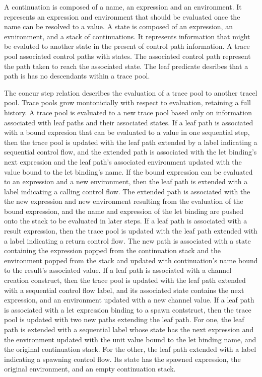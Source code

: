 \documentclass{article}
\begin{document}
A continuation is composed of a name, an expression and an environment.  It represents an expression and environment that should be evaluated once the name can be resolved to a value.  A state is composed of an expression, an evnironment, and a stack of continuations.  It represents information that might be evaluted to another state in the present of control path information.  A trace pool associated control paths with states.  The associated control path represent the path taken to reach the associated state.
The leaf predicate desribes that a path is has no descendants within a trace pool.  

The concur step relation describes the evaluation of a trace pool to another tracel pool.  Trace pools grow montonicially with
respect to evaluation, retaining a full history.  A trace pool is evaluated to a new trace pool based only on information
associated with leaf paths and their associated states.  If a leaf path is associated with a bound expresion that can be evaluated
to a value in one sequential step, then the trace pool is updated with the leaf path extended by a label indicating a sequential
control flow, and the extended path is associated with the let binding's next expression and the leaf path's associated environment
updated with the value bound to the let binding's name.  If the bound expression can be evaluated to an expression and a new 
environment, then the leaf path is extended with a label indicating a calling control flow.  The extended path is associated with
the the new expression and new environment resulting from the evaluation of the bound expression, and the name and expression of the
let binding are pushed onto the stack to be evaluated in later steps.  If a leaf path is associated with a result expression, then
the trace pool is updated with the leaf path extended with a label indicating a return control flow.  The new path is associated
with a state containing the expression popped from the continuation stack and the environment popped from the stack and updated
with continuation's name bound to the result's associated value.  If a leaf path is associated with a channel creation construct,
then the trace pool is updated with the leaf path extended with a sequential control flow label, and its associated state contains
the next expression, and an environment updated with a new channel value.  If a leaf path is associated with a let expression
binding to a spawn contstruct, then the trace pool is updated with two new paths extending the leaf path.  For one, the leaf path
is extended with a sequential label whose state has the next expression and the environment updated with the unit value bound to
the let binding name, and the original continuation stack. For the other, the leaf path extended with a label indicating a spawning
control flow.  Its state has the spawned expression, the original environment, and an empty continuation stack.  
\end{document}
